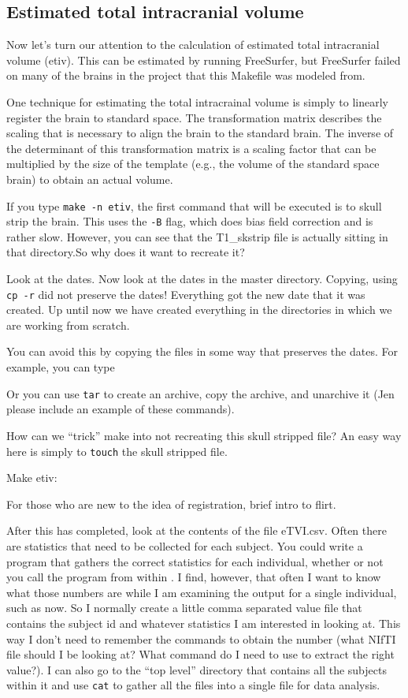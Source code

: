 \subsection{Estimated total intracranial volume}
Now let's turn our attention to the calculation of estimated total intracranial volume (etiv). This can be estimated by running FreeSurfer, but FreeSurfer failed on many of the brains in the project that this Makefile was modeled from.

One technique for estimating the total intracrainal volume is simply
to linearly register the brain to standard space. The transformation
matrix describes the scaling that is necessary to align the brain to
the standard brain. The inverse of the determinant of this
transformation matrix is a scaling factor that can be multiplied by the size of the template (e.g., the volume of the standard space brain) to obtain an actual volume.

If you type \texttt{make -n etiv}, the first command that will be executed is to skull strip the brain. This uses the \texttt{-B} flag, which does bias field correction and is rather slow. However, you can see that the T1_skstrip file is actually sitting in that directory.So why does it want to recreate it?

Look at the dates. Now look at the dates in the master directory. Copying, using \texttt{cp -r} did not preserve the dates! Everything got the new date that it was created. Up until now we have created everything in the directories in which we are working from scratch. 

You can avoid this by copying the files in some way that preserves the dates. For example,
you can type

Or you can use \texttt{tar} to create an archive, copy the archive, and unarchive it (Jen please include an example of these commands). 

How can we ``trick'' make into not recreating this skull stripped file?
An easy way here is simply to \texttt{touch} the skull stripped file.

Make etiv:

For those who are new to the idea of registration, brief intro to flirt.

After this has completed, look at the contents of the file
eTVI.csv. Often there are statistics that need to be collected for
each subject. You could write a program that gathers the correct
statistics for each individual, whether or not you call the program
from within \maken{}. I find, however, that often I want to know what
those numbers are while I am examining the output for a single
individual, such as now. So I normally create a little comma separated
value file that contains the subject id and whatever statistics I am
interested in looking at. This way I don't need to remember the
commands to obtain the number (what NIfTI file should I be looking at?
What command do I need to use to extract the right value?). I can also
go to the ``top level'' directory that contains all the subjects
within it and use \texttt{cat} to gather all the files into a single
file for data analysis.


